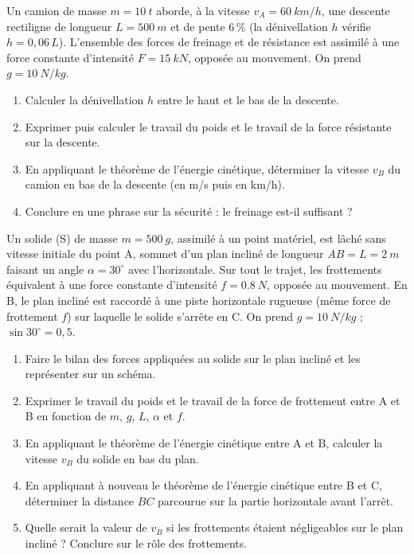 \documentclass[11pt]{article}
\newcounter{popsec}
\newcounter{popsub}
\newcommand{\courssub}[1]{%
  \stepcounter{popsub}%
  \par\vspace{9pt}\noindent{\popxbold\fontsize{11.5}{13}\selectfont\color{popink}{\color{poporange}\thepopsec.\thepopsub}\hspace{6pt}#1}\par\nopagebreak\vspace{4pt}
}
\begin{document}
\begin{exercice}
Un camion de masse $m = \SI{10}{t}$ aborde, à la vitesse $v_A = \SI{60}{km/h}$, une descente rectiligne de longueur $L = \SI{500}{m}$ et de pente $6\,\%$ (la dénivellation $h$ vérifie $h = 0{,}06\,L$). L'ensemble des forces de freinage et de résistance est assimilé à une force constante d'intensité $F = \SI{15}{kN}$, opposée au mouvement. On prend $g = \SI{10}{N/kg}$.
\begin{enumerate}
\item Calculer la dénivellation $h$ entre le haut et le bas de la descente.
\item Exprimer puis calculer le travail du poids et le travail de la force résistante sur la descente.
\item En appliquant le théorème de l'énergie cinétique, déterminer la vitesse $v_B$ du camion en bas de la descente (en m/s puis en km/h).
\item Conclure en une phrase sur la sécurité : le freinage est-il suffisant ?
\end{enumerate}
\end{exercice}

\courssub{Je me prépare au Probatoire}

\begin{exercice}
Un solide (S) de masse $m = \SI{500}{g}$, assimilé à un point matériel, est lâché sans vitesse initiale du point A, sommet d'un plan incliné de longueur $AB = L = \SI{2}{m}$ faisant un angle $\alpha = 30^{\circ}$ avec l'horizontale. Sur tout le trajet, les frottements équivalent à une force constante d'intensité $f = \SI{0,8}{N}$, opposée au mouvement. En B, le plan incliné est raccordé à une piste horizontale rugueuse (même force de frottement $f$) sur laquelle le solide s'arrête en C. On prend $g = \SI{10}{N/kg}$ ; $\sin 30^{\circ} = 0{,}5$.
\begin{enumerate}
\item Faire le bilan des forces appliquées au solide sur le plan incliné et les représenter sur un schéma.
\item Exprimer le travail du poids et le travail de la force de frottement entre A et B en fonction de $m$, $g$, $L$, $\alpha$ et $f$.
\item En appliquant le théorème de l'énergie cinétique entre A et B, calculer la vitesse $v_B$ du solide en bas du plan.
\item En appliquant à nouveau le théorème de l'énergie cinétique entre B et C, déterminer la distance $BC$ parcourue sur la partie horizontale avant l'arrêt.
\item Quelle serait la valeur de $v_B$ si les frottements étaient négligeables sur le plan incliné ? Conclure sur le rôle des frottements.
\end{enumerate}
\end{exercice}
\end{document}
